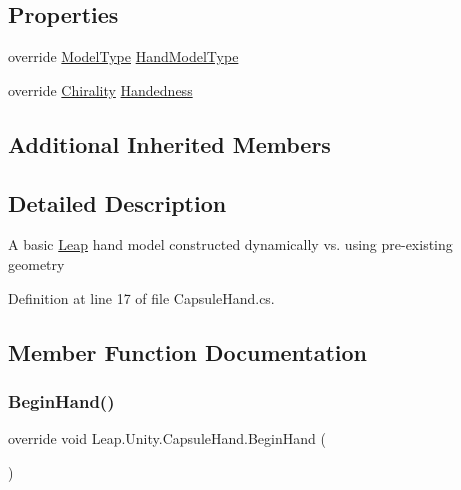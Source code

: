 \subsection*{Properties}
\begin{DoxyCompactItemize}
\item 
override \mbox{\hyperlink{namespace_leap_1_1_unity_a186e5eb0a2b743f1f6b79346f0ab8ad0}{Model\+Type}} \mbox{\hyperlink{class_leap_1_1_unity_1_1_capsule_hand_ab52300f3cc5876781c6a481eb67a71ba}{Hand\+Model\+Type}}
\item 
override \mbox{\hyperlink{namespace_leap_1_1_unity_a4d15adcf20ba121b2cd9c07f503b606f}{Chirality}} \mbox{\hyperlink{class_leap_1_1_unity_1_1_capsule_hand_a26d25d13c4d57f4425be3d7e771e1c93}{Handedness}}
\end{DoxyCompactItemize}
\subsection*{Additional Inherited Members}


\subsection{Detailed Description}
A basic \mbox{\hyperlink{namespace_leap_1_1_unity_1_1_leap}{Leap}} hand model constructed dynamically vs. using pre-\/existing geometry 

Definition at line 17 of file Capsule\+Hand.\+cs.



\subsection{Member Function Documentation}
\mbox{\label{class_leap_1_1_unity_1_1_capsule_hand_a7d7dc1487d108b421878276cc3747c52}} 
\subsubsection{\texorpdfstring{BeginHand()}{BeginHand()}}
{\footnotesize\ttfamily override void Leap.\+Unity.\+Capsule\+Hand.\+Begin\+Hand (\begin{DoxyParamCaption}{ }\end{DoxyParamCaption})\hspace{0.3cm}{\ttfamily [virtual]}}



